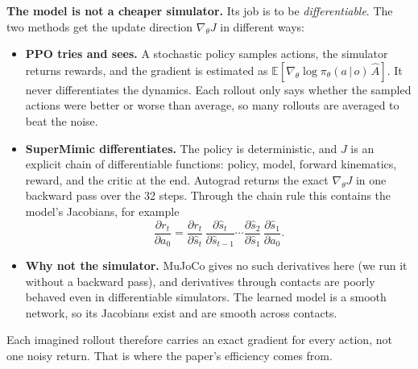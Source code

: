 \documentclass[10pt]{article}
\begin{document}
\textbf{The model is not a cheaper simulator.} Its job is to be \emph{differentiable}. The two
methods get the update direction $\nabla_\theta J$ in different ways:
\begin{itemize}
  \item \textbf{PPO tries and sees.} A stochastic policy samples actions, the simulator returns
  rewards, and the gradient is estimated as $\mathbb E[\nabla_\theta \log\pi_\theta(a\,|\,o)\,\hat A]$.
  It never differentiates the dynamics. Each rollout only says whether the sampled actions were better
  or worse than average, so many rollouts are averaged to beat the noise.
  \item \textbf{SuperMimic differentiates.} The policy is deterministic, and $J$ is an explicit chain of
  differentiable functions: policy, model, forward kinematics, reward, and the critic at the end.
  Autograd returns the exact $\nabla_\theta J$ in one backward pass over the 32 steps. Through the
  chain rule this contains the model's Jacobians, for example
  \[
  \frac{\partial r_t}{\partial a_0} = \frac{\partial r_t}{\partial \hat s_t}\,
  \frac{\partial \hat s_t}{\partial \hat s_{t-1}} \cdots \frac{\partial \hat s_2}{\partial \hat s_1}\,
  \frac{\partial \hat s_1}{\partial a_0}.
  \]
  \item \textbf{Why not the simulator.} MuJoCo gives no such derivatives here (we run it without a
  backward pass), and derivatives through contacts are poorly behaved even in differentiable
  simulators. The learned model is a smooth network, so its Jacobians exist and are smooth across
  contacts.
\end{itemize}
Each imagined rollout therefore carries an exact gradient for every action, not one noisy return. That
is where the paper's efficiency comes from.
\end{document}
